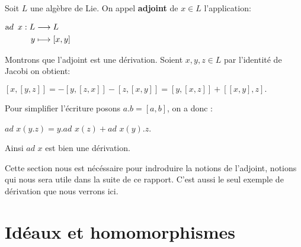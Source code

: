 \documentclass[a4paper,openany,12pt]{report}
\newcommand{\CC}{\mathbb{C}}
\newcommand{\ssl}{\mathfrak{sl}}
\theoremstyle{break}
{\theorembodyfont{\upshape}
\newtheorem*{rmq}{Remarque :}
\newtheorem*{prv}{Preuve :}
\newtheorem*{ex}{Exemples :}
\newtheorem{exe}{Exemple : }
\newtheorem*{nota}{Notation :}}
\begin{document}
\begin{exe}
\quad Soit $L$ une algèbre de Lie. On appel \textbf{adjoint} de $x \in L$ l'application:
\begin{center}
$\begin{aligned} \text  ad \enskip x : L & \longrightarrow L \\ y & \longmapsto[x, y] \end{aligned}$
\end{center} 
Montrons que l'adjoint est une dérivation. Soient $x,y,z \in L$ par l'identité de Jacobi on obtient:
\begin{center}
$[x,[y,z]]=-[y,[z,x]]-[z,[x,y]]=[y,[x,z]]+[[x,y],z].$
\end{center}
Pour simplifier l'écriture posons $a.b=[a,b]$, on a donc :
\begin{center}
$ad$ $x(y.z)=y.ad$ $x(z)+ad$ $x(y).z$.
\end{center} 
Ainsi $ad$ $x$ est bien une dérivation.
\end{exe}

Cette section nous est nécéssaire pour indroduire la notions de l'adjoint, notions qui nous sera utile dans la suite de ce rapport. 
C'est aussi le seul exemple de dérivation que nous verrons ici.

\section{Idéaux et homomorphismes}
\end{document}
